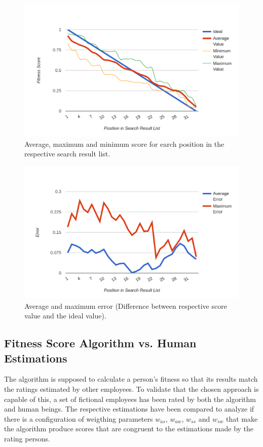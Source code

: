 \begin{figure}[H]
    \centering
    \includegraphics[width=\textwidth]{images/dist_avg.png}
    \caption[Diagram: Fitness Score Distribution (Processed)]{Average, maximum and minimum score for earch position in the respective search result list.}
    \label{fig:dist-avg}
\end{figure}

\begin{figure}[H]
    \centering
    \includegraphics[width=\textwidth]{images/dist_error.png}
    \caption[Diagram: Fitness Score Distribution (Error Rates)]{Average and maximum error (Difference between respective score value and the ideal value).}
    \label{fig:dist-err}
\end{figure}

\newpage

\subsection{Fitness Score Algorithm vs. Human Estimations}
The algorithm is supposed to calculate a person's fitness so that its results match the ratings estimated by other employees. To validate that
the chosen approach is capable of this, a set of fictional employees has been rated by both the algorithm and human beings. The respective estimations have been compared to analyze if there is a configuration of weigthing parameters $w_{as}$, $w_{aw}$, $w_{ss}$ and $w_{sw}$ that make the algorithm produce scores that are
congruent to the estimations made by the rating persons.

